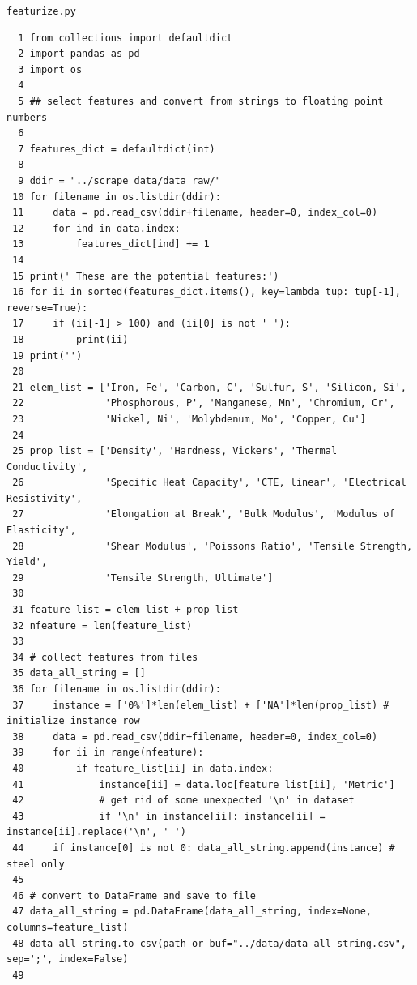\documentclass[10pt,aps,prb,amsmath,amssymb,twocolumn,letterpaper,nobalancelastpage,final,citeautoscript,floatfix,raggedbottom,superscriptaddress]{revtex4-1}
\begin{document}
\clearpage
\noindent \texttt{\Large{featurize.py}\label{code:featurize}}
\begin{lstlisting}
  1 from collections import defaultdict
  2 import pandas as pd
  3 import os
  4 
  5 ## select features and convert from strings to floating point numbers
  6 
  7 features_dict = defaultdict(int)
  8 
  9 ddir = "../scrape_data/data_raw/"
 10 for filename in os.listdir(ddir):
 11     data = pd.read_csv(ddir+filename, header=0, index_col=0)
 12     for ind in data.index:
 13         features_dict[ind] += 1
 14 
 15 print(' These are the potential features:')
 16 for ii in sorted(features_dict.items(), key=lambda tup: tup[-1], reverse=True):
 17     if (ii[-1] > 100) and (ii[0] is not ' '):
 18         print(ii)
 19 print('')
 20 
 21 elem_list = ['Iron, Fe', 'Carbon, C', 'Sulfur, S', 'Silicon, Si', 
 22              'Phosphorous, P', 'Manganese, Mn', 'Chromium, Cr', 
 23              'Nickel, Ni', 'Molybdenum, Mo', 'Copper, Cu']
 24 
 25 prop_list = ['Density', 'Hardness, Vickers', 'Thermal Conductivity',
 26              'Specific Heat Capacity', 'CTE, linear', 'Electrical Resistivity',
 27              'Elongation at Break', 'Bulk Modulus', 'Modulus of Elasticity',
 28              'Shear Modulus', 'Poissons Ratio', 'Tensile Strength, Yield',
 29              'Tensile Strength, Ultimate']
 30 
 31 feature_list = elem_list + prop_list
 32 nfeature = len(feature_list)
 33 
 34 # collect features from files
 35 data_all_string = []
 36 for filename in os.listdir(ddir):
 37     instance = ['0%']*len(elem_list) + ['NA']*len(prop_list) # initialize instance row
 38     data = pd.read_csv(ddir+filename, header=0, index_col=0)
 39     for ii in range(nfeature): 
 40         if feature_list[ii] in data.index:
 41             instance[ii] = data.loc[feature_list[ii], 'Metric']
 42             # get rid of some unexpected '\n' in dataset
 43             if '\n' in instance[ii]: instance[ii] = instance[ii].replace('\n', ' ')
 44     if instance[0] is not 0: data_all_string.append(instance) # steel only
 45 
 46 # convert to DataFrame and save to file
 47 data_all_string = pd.DataFrame(data_all_string, index=None, columns=feature_list)
 48 data_all_string.to_csv(path_or_buf="../data/data_all_string.csv", sep=';', index=False)
 49 
\end{lstlisting}
\clearpage
\end{document}
